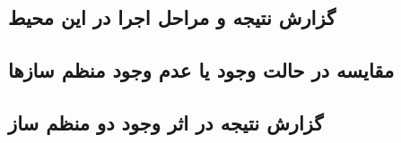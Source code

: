 \documentclass{article}
\begin{document}
\subsection{گزارش نتیجه و مراحل اجرا در این محیط}
\subsection{مقایسه در حالت وجود یا عدم وجود منظم ساز‌ها}
\subsection{گزارش نتیجه در اثر وجود دو منظم ساز}

\section{}
\end{document}
